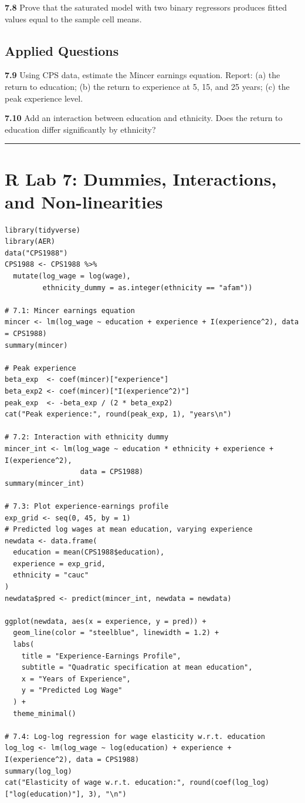 \textbf{7.8} Prove that the saturated model with two binary regressors produces fitted values equal to the sample cell means.

\subsection{Applied Questions}

\textbf{7.9} Using CPS data, estimate the Mincer earnings equation. Report: (a) the return to education; (b) the return to experience at 5, 15, and 25 years; (c) the peak experience level.

\textbf{7.10} Add an interaction between education and ethnicity. Does the return to education differ significantly by ethnicity?

\medskip\hrule\medskip

\section{R Lab 7: Dummies, Interactions, and Non-linearities}

\begin{lstlisting}
library(tidyverse)
library(AER)
data("CPS1988")
CPS1988 <- CPS1988 %>%
  mutate(log_wage = log(wage),
         ethnicity_dummy = as.integer(ethnicity == "afam"))

# 7.1: Mincer earnings equation
mincer <- lm(log_wage ~ education + experience + I(experience^2), data = CPS1988)
summary(mincer)

# Peak experience
beta_exp  <- coef(mincer)["experience"]
beta_exp2 <- coef(mincer)["I(experience^2)"]
peak_exp  <- -beta_exp / (2 * beta_exp2)
cat("Peak experience:", round(peak_exp, 1), "years\n")

# 7.2: Interaction with ethnicity dummy
mincer_int <- lm(log_wage ~ education * ethnicity + experience + I(experience^2),
                  data = CPS1988)
summary(mincer_int)

# 7.3: Plot experience-earnings profile
exp_grid <- seq(0, 45, by = 1)
# Predicted log wages at mean education, varying experience
newdata <- data.frame(
  education = mean(CPS1988$education),
  experience = exp_grid,
  ethnicity = "cauc"
)
newdata$pred <- predict(mincer_int, newdata = newdata)

ggplot(newdata, aes(x = experience, y = pred)) +
  geom_line(color = "steelblue", linewidth = 1.2) +
  labs(
    title = "Experience-Earnings Profile",
    subtitle = "Quadratic specification at mean education",
    x = "Years of Experience",
    y = "Predicted Log Wage"
  ) +
  theme_minimal()

# 7.4: Log-log regression for wage elasticity w.r.t. education
log_log <- lm(log_wage ~ log(education) + experience + I(experience^2), data = CPS1988)
summary(log_log)
cat("Elasticity of wage w.r.t. education:", round(coef(log_log)["log(education)"], 3), "\n")
\end{lstlisting}


